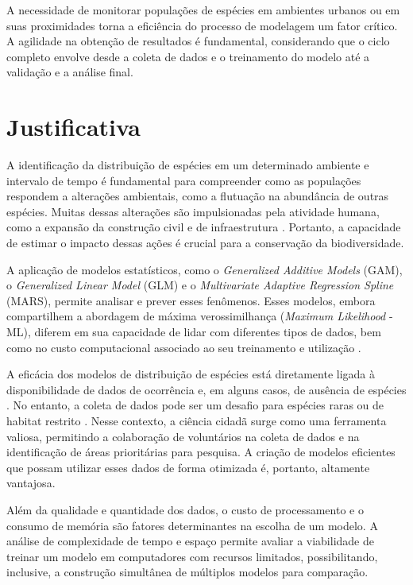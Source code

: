 \documentclass[
    12pt,               %
    openright,          %
    oneside,            %
    a4paper,            %
    english,            %
    brazil              %
    ]{abntex2}
\begin{document}
A necessidade de monitorar populações de espécies em ambientes urbanos ou em suas proximidades torna a eficiência do processo de modelagem um fator crítico. 
A agilidade na obtenção de resultados é fundamental, considerando que o ciclo completo envolve desde a coleta de dados e o treinamento do modelo até a validação e a análise final.
 
\section{Justificativa}

A identificação da distribuição de espécies em um determinado ambiente e intervalo de tempo é fundamental 
para compreender como as populações respondem a alterações ambientais, como a flutuação na abundância de outras espécies. 
Muitas dessas alterações são impulsionadas pela atividade humana, como a expansão da construção civil e de infraestrutura 
\cite{impactConstruction}. Portanto, a capacidade de estimar o impacto dessas ações é crucial para a conservação da biodiversidade.

A aplicação de modelos estatísticos, como o \textit{Generalized Additive Models} (GAM), o \textit{Generalized Linear Model} (GLM) e o 
\textit{Multivariate Adaptive Regression Spline} (MARS), permite analisar e prever esses fenômenos. Esses modelos, embora compartilhem 
a abordagem de máxima verossimilhança (\textit{Maximum Likelihood} - ML), diferem em sua capacidade de lidar com diferentes tipos de dados, 
bem como no custo computacional associado ao seu treinamento e utilização \cite{predPerform33models}.

A eficácia dos modelos de distribuição de espécies está diretamente ligada à disponibilidade de dados de ocorrência e, em alguns casos, 
de ausência de espécies \cite{sampleSize}. No entanto, a coleta de dados pode ser um desafio para espécies raras ou de habitat restrito 
\cite{especiesDificies}. Nesse contexto, a ciência cidadã surge como uma ferramenta valiosa, permitindo a colaboração de voluntários 
na coleta de dados e na identificação de áreas prioritárias para pesquisa. A criação de modelos eficientes que possam utilizar esses 
dados de forma otimizada é, portanto, altamente vantajosa.

Além da qualidade e quantidade dos dados, o custo de processamento e o consumo de memória são fatores determinantes na escolha de um modelo. 
A análise de complexidade de tempo e espaço \cite{introductionAlgorthms} permite avaliar a viabilidade de treinar um modelo em computadores 
com recursos limitados, possibilitando, inclusive, a construção simultânea de múltiplos modelos para comparação.
\end{document}
